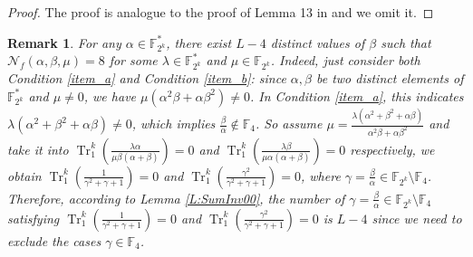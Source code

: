 \documentclass{article}
\newcommand{\F}{\mathbb{F}}
\newcommand{\0}{\textbf{0}}
\newcommand{\1}{\textbf{1}}
\newcommand{\TRACE}{\operatorname{Tr}_1^k}
\theoremstyle{plain}
\newtheorem{remark}{Remark}
\begin{document}
    \begin{proof}
        The proof is analogue to the proof of Lemma 13 in \cite{TangMM2022inversefunction} and we omit it.
    \end{proof}
    \begin{remark}
        For any $\alpha\in\F_{2^k}^*$, there exist $L-4$ distinct values of $\beta$
        such that $\mathcal{N}_f(\alpha,\beta,\mu)=8$ for some $\lambda\in\F_{2^k}^*$ and $\mu\in\F_{2^k}$.
        Indeed, just consider both Condition \ref{item_a} and Condition \ref{item_b}: 
        since $\alpha,\beta$ be two distinct elements of $\F_{2^k}^*$ and $\mu\ne 0$, 
        we have $\mu(\alpha^2\beta+\alpha\beta^2)\ne 0$. 
        In Condition \ref{item_a}, this indicates $\lambda(\alpha^2+\beta^2+\alpha\beta)\ne 0$,
        which implies $\frac{\beta}{\alpha}\notin\F_4$.
        So assume $\mu=\frac{\lambda(\alpha^2+\beta^2+\alpha\beta)}{\alpha^2\beta+\alpha\beta^2}$ and take it
        into $\TRACE\left(\frac{\lambda \alpha}{\mu \beta(\alpha+\beta)}\right)=0$
        and $\TRACE\left(\frac{\lambda \beta}{\mu \alpha(\alpha+\beta)}\right)=0$ respectively,
        we obtain $\TRACE\left(\frac{1}{\gamma^2+\gamma+1}\right)=0$ and $\TRACE\left(\frac{\gamma^2}{\gamma^2+\gamma+1}\right)=0$,
        where $\gamma=\frac{\beta}{\alpha}\in\F_{2^k}\setminus\F_{4}$.
        Therefore, according to Lemma \ref{L:SumInv00},
        the number of $\gamma=\frac{\beta}{\alpha}\in\F_{2^k}\setminus\F_{4}$ satisfying
        $\TRACE\left(\frac{1}{\gamma^2+\gamma+1}\right)=0$ and $\TRACE\left(\frac{\gamma^2}{\gamma^2+\gamma+1}\right)=0$
        is $L-4$ since we need to exclude the cases $\gamma\in\F_4$.
    \end{remark}
\end{document}
